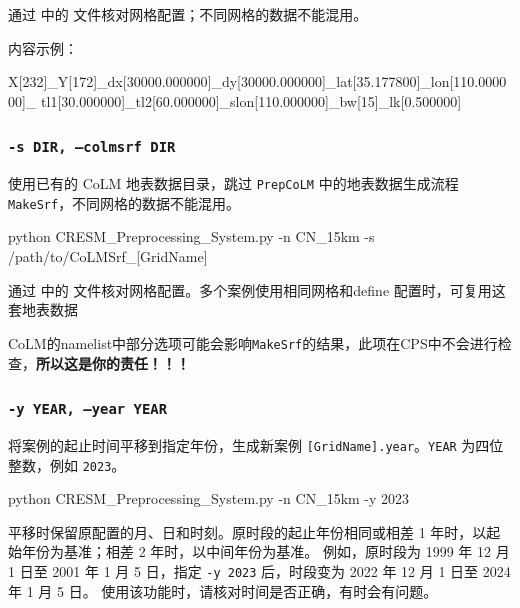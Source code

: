 \documentclass[UTF8,a4paper,11pt,fontset=none]{ctexart}
\begin{document}
通过  中的  文件核对网格配置；不同网格的数据不能混用。

 内容示例：
\begin{CPSCode}[leftmargin=2em,commandchars=\\\{\}]
    X[232]_Y[172]_dx[30000.000000]_dy[30000.000000]_lat[35.177800]_lon[110.000000]_
    tl1[30.000000]_tl2[60.000000]_slon[110.000000]_bw[15]_lk[0.500000]
\end{CPSCode}


\subsubsection{\texttt{-s\ DIR,\ --colmsrf\ DIR}}

使用已有的 CoLM 地表数据目录，跳过 \texttt{PrepCoLM} 中的地表数据生成流程\texttt{MakeSrf}，不同网格的数据不能混用。
\begin{CPSCode} [leftmargin=2em,commandchars=\\\{\}]
    python CRESM_Preprocessing_System.py -n CN_15km -s /path/to/CoLMSrf_[GridName]
\end{CPSCode}

通过  中的  文件核对网格配置。多个案例使用相同网格和define 配置时，可复用这套地表数据
\begin{CPSEmphasis}[!请重视!]
    CoLM的namelist中部分选项可能会影响\texttt{MakeSrf}的结果，此项在CPS中不会进行检查，\textbf{所以这是你的责任！！！}
\end{CPSEmphasis}


\subsubsection{\texttt{-y\ YEAR,\ --year\ YEAR}}

将案例的起止时间平移到指定年份，生成新案例 \texttt{[GridName].year}。\texttt{YEAR} 为四位整数，例如 \texttt{2023}。
\begin{CPSCode} [leftmargin=2em,commandchars=\\\{\}]
    python CRESM_Preprocessing_System.py -n CN_15km -y 2023 
\end{CPSCode}

平移时保留原配置的月、日和时刻。原时段的起止年份相同或相差 1 年时，以起始年份为基准；相差 2 年时，以中间年份为基准。
例如，原时段为 1999 年 12 月 1 日至 2001 年 1 月 5 日，指定 \texttt{-y 2023} 后，时段变为 2022 年 12 月 1 日至 2024 年 1 月 5 日。
使用该功能时，请核对时间是否正确，有时会有问题。
\end{document}
